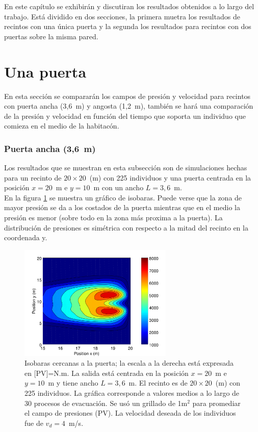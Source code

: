 En este capítulo se exhibirán y discutiran los resultados obtenidos a lo largo del trabajo. Está dividido en dos secciones, la primera muetra los resultados de recintos con una única puerta y la segunda los resultados para recintos con dos puertas sobre la misma pared.  

\section{Una puerta}

En esta sección se compararán los campos de presión y velocidad para recintos con puerta ancha (3,6~m) y angosta (1,2~m), también se hará una comparación de la presión y velocidad en función del tiempo que soporta un individuo que comieza en el medio de la habitacón.    

\subsubsection{Puerta ancha (3,6~m)}

Los resultados que se muestran en esta subsección son de simulaciones hechas para un recinto de  $20\times 20$~(m) con 225 individuos y una puerta centrada en la posición $x=20$~m e $y=10$~m con un ancho $L=3,6$~m.\\
En la figura \ref{isobaras_3_6m} se muestra un gráfico de isobaras. Puede verse que la zona de mayor presión se da a los costados de la puerta mientras que en el medio la presión es menor (sobre todo en la zona más proxima a la puerta). La distribución de presiones es simétrica con respecto a la mitad del recinto en la coordenada y. 

\begin{figure}[H]
    \centering
    \includegraphics[height=5.5cm]{figuras/press_225p_v4_onedoor_3_6.png}
    \caption[width=5cm]{Isobaras cercanas a la puerta; la escala a la derecha está expresada en [PV]=N.m. La salida está centrada en la posición $x=20$~m e $y=10$~m y tiene ancho $L=3,6$~m. El recinto es de $20\times 20$~(m) con 225 individuos. La gráfica corresponde a valores medios a lo largo de 30 procesos de evacuación. Se usó un grillado de 1m$^2$ para promediar el campo de presiones (PV). La velocidad deseada de los individuos fue de $v_d=4$~m/s.}
    \label{isobaras_3_6m}
\end{figure}

